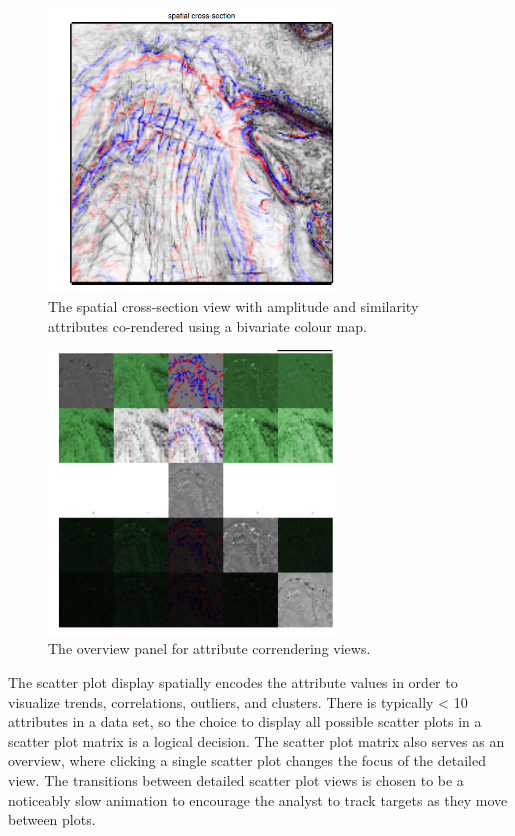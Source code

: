 \documentclass[journal]{vgtc}                %
\begin{document}
\begin{figure}[htb]
\centering
\includegraphics[width=3in]{corender}
\caption{The spatial cross-section view with amplitude and similarity attributes co-rendered using a bivariate colour map.}
\end{figure}

\begin{figure}[htb]
\centering
\includegraphics[width=3in]{corender_overview}
\caption{The overview panel for attribute correndering views.}
\end{figure}

The scatter plot display spatially encodes the attribute values in order to visualize trends,
correlations, outliers, and clusters. There is typically < 10 attributes in a data set, so
the choice to display all possible scatter plots in a scatter plot matrix is a logical decision.
The scatter plot matrix also serves as an overview, where clicking a single scatter plot changes the
focus of the detailed view. The transitions between detailed scatter plot views is chosen to be
a noticeably slow animation to encourage the analyst to track targets as they move between plots.
\end{document}
